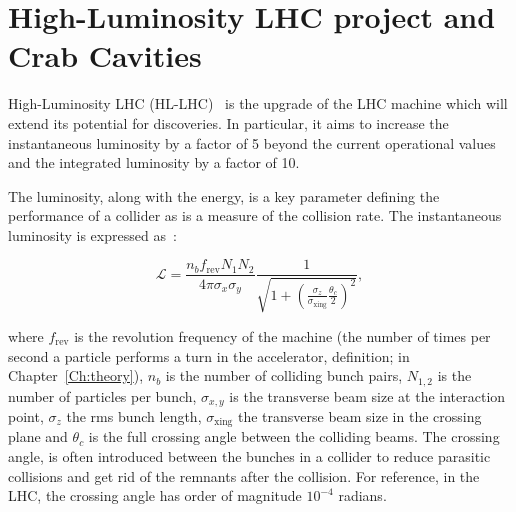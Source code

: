 \section{High-Luminosity LHC project and Crab Cavities}
High-Luminosity LHC (HL-LHC)~\cite{HL_LHC_yellow_report, Brning2015} is the upgrade of the LHC machine which will extend its potential for discoveries. In particular, it aims to increase the instantaneous luminosity by a factor of 5 beyond the current operational values and the integrated luminosity by a factor of 10. 

The luminosity, along with the energy, is a key parameter defining the performance of a collider as is a measure of the collision rate. The instantaneous luminosity is expressed as~\cite{luminosity}:

\begin{equation}\label{eq:luminosity_inst}
    \mathcal{L} = \frac{n_b f_\mathrm{rev}N_1 N_2}{4 \pi \sigma_x \sigma_y} \frac{1}{\sqrt{1+(\frac{\sigma_z}{\sigma_\mathrm{xing}} \frac{\theta_c}{2})^2}},
\end{equation}

where $f_{\mathrm{rev}}$ is the revolution frequency of the machine (the number of times per second a particle performs a turn in the accelerator, definition; in Chapter~\ref{Ch:theory}), $n_b$ is the number of colliding bunch pairs, $N_{1,2}$ is the number of particles per bunch, $\sigma_{x,y}$ is the transverse beam size at the interaction point, $\sigma_z$ the rms bunch length, $\sigma_{\mathrm{xing}}$ the transverse beam size in the crossing plane and $\theta_c$ is the full crossing angle between the colliding beams. %
 The crossing angle, is often introduced between the bunches in a collider to reduce parasitic collisions and get rid of the remnants after the collision. For reference, in the LHC, the crossing angle has order of magnitude $10^{-4}$ radians. %

